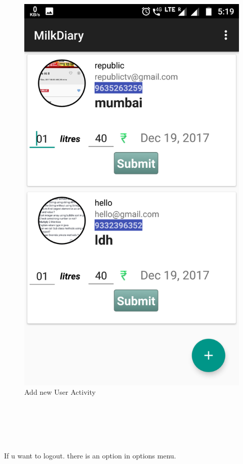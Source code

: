 \begin{figure}[h]
	\centering
	\includegraphics[width=0.7\linewidth]{s08}
	\caption{Add new User Activity}
\end{figure}
\begin{text}
	\\
	\\
	\\
	\\
\end{text}
If u want to logout. there is an option in options menu.
